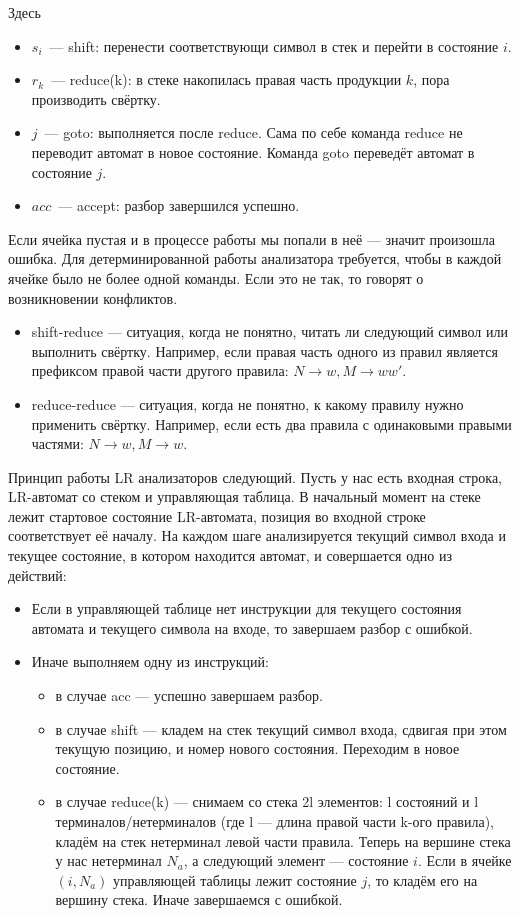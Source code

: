 Здесь
\begin{itemize}
  \item $s_i$~--- shift: перенести соответствующи символ в стек и перейти в состояние $i$.
  \item $r_k$~--- reduce(k): в стеке накопилась правая часть продукции $k$, пора производить свёртку.
  \item $j$~--- goto: выполняется после reduce. Сама по себе команда reduce не переводит автомат в новое состояние. Команда goto переведёт автомат в состояние $j$.
  \item $acc$~--- accept: разбор завершился успешно.
\end{itemize}

Если ячейка пустая и в процессе работы мы попали в неё --- значит произошла ошибка. Для детерминированной работы анализатора требуется, чтобы в каждой ячейке было не более одной команды. Если это не так, то говорят о возникновении конфликтов.

\begin{itemize}
\item shift-reduce --- ситуация, когда не понятно, читать ли следующий символ или выполнить свёртку. Например, если правая часть одного из правил является префиксом правой части другого правила: $N \rightarrow w, M \rightarrow ww'$.
\item reduce-reduce --- ситуация, когда не понятно, к какому правилу нужно применить свёртку.
Например, если есть два правила с одинаковыми правыми частями: $N \rightarrow w, M \rightarrow w$.
\end{itemize}

Принцип работы LR анализаторов следующий. Пусть у нас есть входная строка, LR-автомат со стеком и управляющая таблица.
В начальный момент на стеке лежит стартовое состояние LR-автомата, позиция во входной строке соответствует её началу.
На каждом шаге анализируется текущий символ входа и текущее состояние, в котором находится автомат, и совершается одно из действий:
\begin{itemize}
\item Если в управляющей таблице нет инструкции для текущего состояния автомата и текущего символа на входе, то завершаем разбор с ошибкой.
\item Иначе выполняем одну из инструкций:
\begin{itemize}
\item в случае acc --- успешно завершаем разбор.
\item в случае shift --- кладем на стек текущий символ входа, сдвигая при этом текущую позицию, и номер нового состояния. Переходим в новое состояние.
\item в случае reduce(k) --- снимаем со стека 2l элементов: l состояний и l терминалов/нетерминалов (где l --- длина правой части k-ого правила), кладём на стек нетерминал левой части правила. Теперь на вершине стека у нас нетерминал $N_a$, а следующий элемент --- состояние $i$. Если в ячейке $(i,N_a)$ управляющей таблицы лежит состояние $j$, то кладём его на вершину стека. Иначе завершаемся с ошибкой.
\end{itemize}
\end{itemize}


